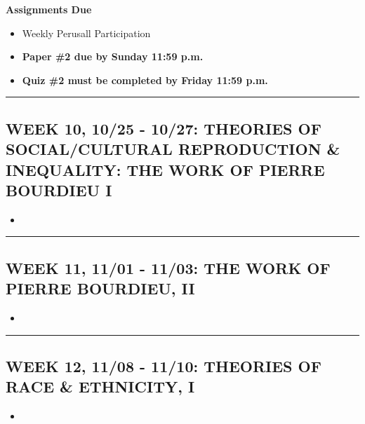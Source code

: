 \documentclass[11pt,]{article}
\providecommand{\tightlist}{%
  \setlength{\itemsep}{0pt}\setlength{\parskip}{0pt}}
\begin{document}
\textbf{Assignments Due}

\begin{itemize}
\tightlist
\item
  Weekly Perusall Participation
\item
  \textbf{Paper \#2 due by Sunday 11:59 p.m.}
\item
  \textbf{Quiz \#2 must be completed by Friday 11:59 p.m.}
\end{itemize}

\bigbreak
\hrule

\hypertarget{week-10-1025---1027-theories-of-socialcultural-reproduction-inequality-the-work-of-pierre-bourdieu-i}{%
\subsection{WEEK 10, 10/25 - 10/27: THEORIES OF SOCIAL/CULTURAL
REPRODUCTION \& INEQUALITY: THE WORK OF PIERRE BOURDIEU
I}\label{week-10-1025---1027-theories-of-socialcultural-reproduction-inequality-the-work-of-pierre-bourdieu-i}}

\begin{itemize}
\tightlist
\item
\end{itemize}

\bigbreak
\hrule

\hypertarget{week-11-1101---1103-the-work-of-pierre-bourdieu-ii}{%
\subsection{WEEK 11, 11/01 - 11/03: THE WORK OF PIERRE BOURDIEU,
II}\label{week-11-1101---1103-the-work-of-pierre-bourdieu-ii}}

\begin{itemize}
\tightlist
\item
\end{itemize}

\bigbreak
\hrule

\hypertarget{week-12-1108---1110-theories-of-race-ethnicity-i}{%
\subsection{WEEK 12, 11/08 - 11/10: THEORIES OF RACE \& ETHNICITY,
I}\label{week-12-1108---1110-theories-of-race-ethnicity-i}}

\begin{itemize}
\tightlist
\item
\end{itemize}
\end{document}
